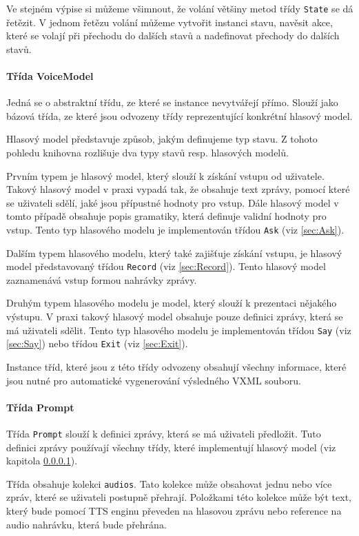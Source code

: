 \documentclass[ing,male,java,dept460,twoside]{diploma}						%
\begin{document}
Ve stejném výpise si můžeme všimnout, že volání většiny metod třídy \texttt{State} se dá řetězit. V jednom řetězu volání můžeme vytvořit instanci stavu, navěsit akce, které se volají při přechodu do dalších stavů a nadefinovat přechody do dalších stavů.

\paragraph{Třída VoiceModel}
\label{sec:VoiceModel}
Jedná se o abstraktní třídu, ze které se instance nevytvářejí přímo. Slouží jako bázová třída, ze které jsou odvozeny třídy reprezentující konkrétní hlasový model.

Hlasový model představuje způsob, jakým definujeme typ stavu. Z tohoto pohledu knihovna rozlišuje dva typy stavů resp. hlasových modelů.

Prvním typem je hlasový model, který slouží k získání vstupu od uživatele. Takový hlasový model v praxi vypadá tak, že obsahuje text zprávy, pomocí které se uživateli sdělí, jaké jsou přípustné hodnoty pro vstup. Dále hlasový model v tomto případě obsahuje popis gramatiky, která definuje validní hodnoty pro vstup. Tento typ hlasového modelu je implementován třídou \texttt{Ask} (viz \ref{sec:Ask}).

Dalším typem hlasového modelu, který také zajišťuje získání vstupu, je hlasový model představovaný třídou \texttt{Record} (viz \ref{sec:Record}). Tento hlasový model zaznamenává vstup formou nahrávky zprávy.

Druhým typem hlasového modelu je model, který slouží k prezentaci nějakého výstupu. V praxi takový hlasový model obsahuje pouze definici zprávy, která se má uživateli sdělit. Tento typ hlasového modelu je implementován třídou \texttt{Say} (viz \ref{sec:Say}) nebo třídou \texttt{Exit} (viz \ref{sec:Exit}).

Instance tříd, které jsou z této třídy odvozeny obsahují všechny informace, které jsou nutné pro automatické vygenerování výsledného VXML souboru.

\paragraph{Třída Prompt}
\label{sec:Prompt}
Třída \texttt{Prompt} slouží k definici zprávy, která se má uživateli předložit. Tuto definici zprávy používají všechny třídy, které implementují hlasový model (viz kapitola \ref{sec:VoiceModel}).

Třída obsahuje kolekci \texttt{audios}. Tato kolekce může obsahovat jednu nebo více zpráv, které se uživateli postupně přehrají. Položkami této kolekce může být text, který bude pomocí TTS enginu převeden na hlasovou zprávu nebo reference na audio nahrávku, která bude přehrána.
\end{document}
